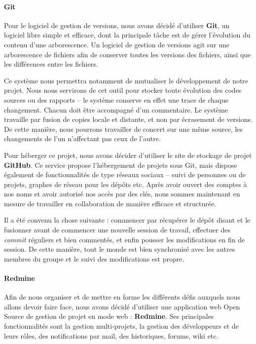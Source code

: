 {\paragraph*{Git\\}
\medskip Pour le logiciel de gestion de versions, nous avons décidé d'utiliser \textbf{Git}, un logiciel libre simple et efficace, dont la principale tâche est de gérer l'évolution du contenu d'une arborescence. Un logiciel de gestion de versions agit sur une arborescence de fichiers afin de conserver toutes les versions des fichiers, ainsi que les différences entre les fichiers.

Ce système nous permettra notamment de mutualiser le développement de notre projet. Nous nous servirons de cet outil pour stocker toute évolution des codes sources ou des rapports -- le système conserve en effet une trace de chaque changement. Chacun doit être accompagné d'un commentaire. Le système travaille par fusion de copies locale et distante, et non par écrasement de versions. De cette manière, nous pourrons travailler de concert sur une même source, les changements de l'un n'affectant pas ceux de l'autre.

Pour héberger ce projet, nous avons décider d'utiliser le site de stockage de projet \textbf{GitHub}. Ce service propose l'hébergement de projets sous Git, mais dispose également de fonctionnalités de type réseaux sociaux -- suivi de personnes ou de projets, graphes de réseau pour les dépôts etc. Après avoir ouvert des comptes à nos noms et avoir autorisé nos accès par des clés, nous sommes maintenant en mesure de travailler en collaboration de manière efficace et structurée.

Il a été convenu la chose suivante : commencer par récupérer le dépôt disant et le fusionner avant de commencer une nouvelle session de travail, effectuer des \textit{commit} réguliers et bien commentés, et enfin pousser les modifications en fin de session. De cette manière, tout le monde est bien synchronisé avec les autres membres du groupe et le suivi des modifications est propre.

\paragraph*{Redmine\\}
Afin de nous organiser et de mettre en forme les différents défis auxquels nous allons devoir faire face, nous avons décidé d'utiliser une application web Open Source de gestion de projet en mode web : \textbf{Redmine}. Ses principales fonctionnalités sont la gestion multi-projets, la gestion des développeurs et de leurs rôles, des notifications par mail, des historiques, forums, wiki etc.

}
